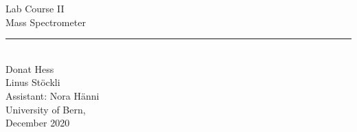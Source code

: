 \begin{center}
    \vspace*{\fill} %
    \LARGE{Lab Course II} \\
    \vspace{5mm}
    \Huge{Mass Spectrometer} \\
    \rule{10cm}{1pt} \\
    \vspace{2cm}
    \Large{Donat Hess \\ Linus Stöckli} \\
    \vspace{1cm}
    \Large{Assistant: Nora Hänni} \\
    \vspace{1cm}
    \Large{University of Bern, \\ December 2020}
    \vspace*{\fill} %
\end{center}